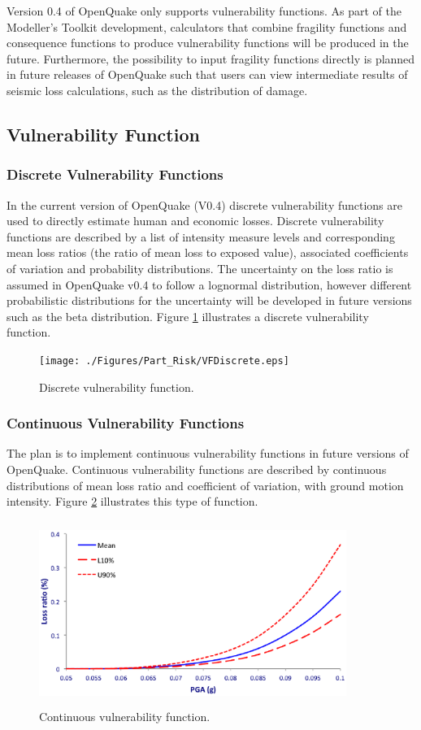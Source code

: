 Version 0.4 of OpenQuake only supports vulnerability functions. As part of the Modeller's Toolkit development, calculators that combine fragility functions and consequence functions to produce vulnerability functions will be produced in the future. Furthermore, the possibility to input fragility functions directly is planned in future releases of OpenQuake such that users can view intermediate results of seismic loss calculations, such as the distribution of damage. 

\subsection{Vulnerability Function}
\subsubsection{Discrete Vulnerability Functions}
In the current version of OpenQuake (V0.4) discrete vulnerability functions are used to directly estimate human and economic losses. Discrete vulnerability functions are described by a list of intensity measure levels and corresponding mean loss ratios (the ratio of mean loss to exposed value), associated coefficients of variation and probability distributions. The uncertainty on the loss ratio is assumed in OpenQuake v0.4 to follow a lognormal distribution, however different probabilistic distributions for the uncertainty will be developed in future versions such as the beta distribution. Figure \ref{fig:VFDiscrete} illustrates a discrete vulnerability function.

\begin{figure}[ht]
\centering
\texttt{[image: ./Figures/Part\_Risk/VFDiscrete.eps]}
\caption{Discrete vulnerability function.}
\label{fig:VFDiscrete}
\end{figure}

\subsubsection{Continuous Vulnerability Functions}
The plan is to implement continuous vulnerability functions in future versions of OpenQuake. Continuous vulnerability functions are described by continuous distributions of mean loss ratio and coefficient of variation, with ground motion intensity. Figure \ref{fig:VFContinuous} illustrates this type of function.

\begin{figure}[ht]
\centering
\includegraphics[width=10cm,height=6cm]{./Figures/Part_Risk/VFContinuous}
\caption{Continuous vulnerability function.}
\label{fig:VFContinuous}
\end{figure}

